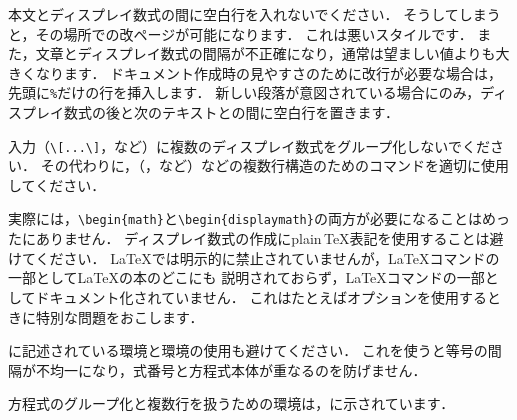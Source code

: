 \begin{center}
\begin{notes}
\item 本文とディスプレイ数式の間に空白行を入れないでください．
そうしてしまうと，その場所での改ページが可能になります．
これは悪いスタイルです．
また，文章とディスプレイ数式の間隔が不正確になり，通常は望ましい値よりも大きくなります．
ドキュメント作成時の見やすさのために改行が必要な場合は，先頭に\verb+%+だけの行を挿入します．
新しい段落が意図されている場合にのみ，ディスプレイ数式の後と次のテキストとの間に空白行を置きます．
\item 入力（\verb+\[...\]+，など）に複数のディスプレイ数式をグループ化しないでください．
その代わりに，（，など）などの複数行構造のためのコマンドを適切に使用してください．
\item 実際には，\verb+\begin{math}+と\verb+\begin{displaymath}+の両方が必要になることはめったにありません．
ディスプレイ数式の作成にplain\,\TeX{}表記\dbldollars{}を使用することは避けてください．
\LaTeX{}では明示的に禁止されていませんが，\LaTeX{}コマンドの一部として\LaTeX{}の本のどこにも
説明されておらず，\LaTeX{}コマンドの一部としてドキュメント化されていません．
これはたとえばオプションを使用するときに特別な問題をおこします．
\item \cite{lamport}に記述されている環境と環境の使用も避けてください．
これを使うと等号の間隔が不均一になり，式番号と方程式本体が重なるのを防げません．
\end{notes}
\end{center}
方程式のグループ化と複数行を扱うための環境は，に示されています．

